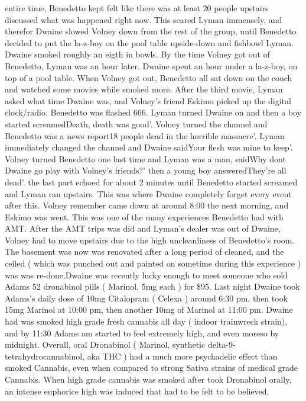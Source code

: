 \documentclass[12pt]{book}
\begin{document}
entire time, Benedetto kept felt like there was at least 20 people upstairs discussed what was happened right now. This scared Lyman immensely, and therefor Dwaine slowed Volney down from the rest of the group, until Benedetto decided to put the la-z-boy on the pool table upside-down and fishbowl Lyman. Dwaine smoked roughly an eigth in bowls. By the time Volney got out of Benedetto, Lyman was an hour later. Dwaine spent an hour under a la-z-boy, on top of a pool table. When Volney got out, Benedetto all sat down on the couch and watched some movies while smoked more. After the third movie, Lyman asked what time Dwaine was, and Volney's friend Eskimo picked up the digital clock/radio. Benedetto was flashed 666. Lyman turned Dwaine on and then a boy started screamedDeath, death was good'. Volney turned the channel and Benedetto was a news report18 people dead in the horrible massacre'. Lyman immediately changed the channel and Dwaine saidYour flesh was mine to keep'. Volney turned Benedetto one last time and Lyman was a man, saidWhy dont Dwaine go play with Volney's friends?' then a young boy answeredThey're all dead'. the last part echoed for about 2 minutes until Benedetto started screamed and Lyman ran upstairs. This was where Dwaine completely forget every event after this. Volney remember came down at around 8:00 the next morning, and Eskimo was went. This was one of the many experiences Benedetto had with AMT. After the AMT trips was did and Lyman's dealer was out of Dwaine, Volney had to move upstairs due to the high uncleanliness of Benedetto's room. The basement was now was renovated after a long period of cleaned, and the ceiled ( which was punched out and painted on sometime during this experience ) was was re-done.Dwaine was recently lucky enough to meet someone who sold Adams 52 dronabinol pills ( Marinol, 5mg each ) for \$95. Last night Dwaine took Adams's daily dose of 10mg Citalopram ( Celexa ) around 6:30 pm, then took 15mg Marinol at 10:00 pm, then another 10mg of Marinol at 11:00 pm. Dwaine had was smoked high grade fresh cannabis all day ( indoor trainwreck strain), and by 11:30 Adams am started to feel extremely high, and even moreso by midnight. Overall, oral Dronabinol ( Marinol, synthetic delta-9-tetrahydrocannabinol, aka THC ) had a much more psychadelic effect than smoked Cannabis, even when compared to strong Sativa strains of medical grade Cannabis. When high grade cannabis was smoked after took Dronabinol orally, an intense euphorice high was induced that had to be felt to be believed.
\end{document}
